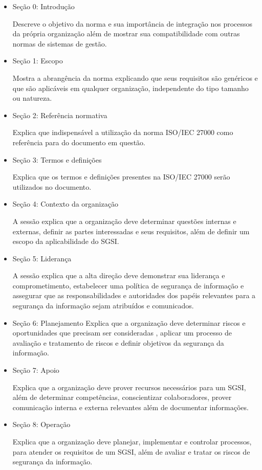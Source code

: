 \begin{itemize}
\item Seção 0: Introdução

    Descreve o objetivo da norma e sua importância de integração nos processos da própria organização além de mostrar sua compatibilidade com outras normas de sistemas de gestão.
\item Seção 1: Escopo

    Mostra a abrangência da norma explicando que seus requisitos são genéricos e  que são aplicáveis em qualquer organização, independente do tipo tamanho ou natureza.
\item Seção 2: Referência normativa

    Explica que indispensável a utilização da norma ISO/IEC 27000  como referência para do documento em questão.
\item Seção 3: Termos e definições

    Explica que os termos e definições presentes na ISO/IEC 27000 serão utilizados no documento.
\item Seção 4: Contexto da organização

    A sessão explica que a organização deve determinar questões internas e externas, definir as partes interessadas e seus requisitos, além de definir um escopo da aplicabilidade do SGSI.
\item Seção 5: Liderança

    A sessão explica que a alta direção deve demonstrar sua liderança e comprometimento, estabelecer uma política de segurança de informação  e assegurar que as responsabilidades e autoridades dos papéis relevantes para a segurança da informação sejam atribuídos e comunicados.
\item Seção 6: Planejamento
    Explica que a organização deve determinar riscos e oportunidades que precisam ser consideradas , aplicar um processo de avaliação e tratamento de riscos e definir objetivos da segurança da informação. 
\item Seção 7: Apoio 

    Explica que a organização deve prover recursos necessários para um SGSI, além de determinar competências, conscientizar colaboradores, prover comunicação interna e externa relevantes além de documentar informações.  

\item Seção 8: Operação

    Explica que a organização deve planejar, implementar e controlar processos, para atender os requisitos de um SGSI, além de avaliar e tratar os riscos de segurança da informação.


\end{itemize}
